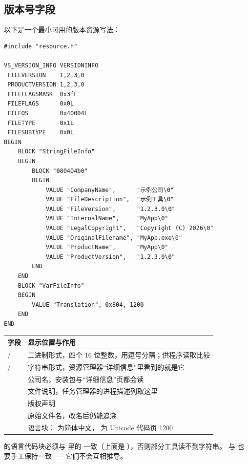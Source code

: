 \subsection{版本号字段}
以下是一个最小可用的版本资源写法：

\begin{lstlisting}[style=cppstyle]
#include "resource.h"

VS_VERSION_INFO VERSIONINFO
 FILEVERSION    1,2,3,0
 PRODUCTVERSION 1,2,3,0
 FILEFLAGSMASK  0x3fL
 FILEFLAGS      0x0L
 FILEOS         0x40004L
 FILETYPE       0x1L
 FILESUBTYPE    0x0L
BEGIN
    BLOCK "StringFileInfo"
    BEGIN
        BLOCK "080404b0"
        BEGIN
            VALUE "CompanyName",      "示例公司\0"
            VALUE "FileDescription",  "示例工具\0"
            VALUE "FileVersion",      "1.2.3.0\0"
            VALUE "InternalName",     "MyApp\0"
            VALUE "LegalCopyright",   "Copyright (C) 2026\0"
            VALUE "OriginalFilename", "MyApp.exe\0"
            VALUE "ProductName",      "MyApp\0"
            VALUE "ProductVersion",   "1.2.3.0\0"
        END
    END
    BLOCK "VarFileInfo"
    BEGIN
        VALUE "Translation", 0x804, 1200
    END
END
\end{lstlisting}

\begin{longtable}{L{6.0cm}L{8.8cm}}
\toprule
\textbf{字段} & \textbf{显示位置与作用} \\
\midrule
{} /  & 二进制形式，四个 16 位整数，用逗号分隔；供程序读取比较 \\
 /  & 字符串形式，资源管理器“详细信息”里看到的就是它 \\
 & 公司名，安装包与“详细信息”页都会读 \\
 & 文件说明，任务管理器的进程描述列取这里 \\
 & 版权声明 \\
 & 原始文件名，改名后仍能追溯 \\
 & 语言块： 为简体中文， 为 Unicode 代码页 1200 \\
\bottomrule
\end{longtable}

\begin{warnbox}[注意]
 的语言代码块必须与  里的  一致（上面是 ），否则部分工具读不到字符串。 与  也要手工保持一致——它们不会互相推导。
\end{warnbox}
